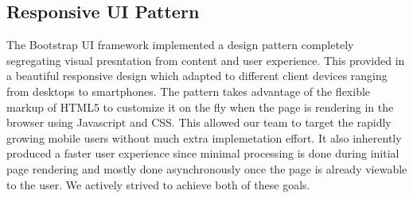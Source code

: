 \subsection{Responsive UI Pattern}
The Bootstrap UI framework implemented a design pattern completely segregating visual presntation from content and user experience. This provided in a beautiful responsive design which adapted to different client devices ranging from desktops to smartphones. The pattern takes advantage of the flexible markup of HTML5 to customize it on the fly when the page is rendering in the browser using Javascript and CSS. This allowed our team to target the rapidly growing mobile users without much extra implemetation effort. It also inherently produced a faster user experience since minimal processing is done during initial page rendering and mostly done asynchronously once the page is already viewable to the user. We actively strived to achieve both of these goals.
\fi
